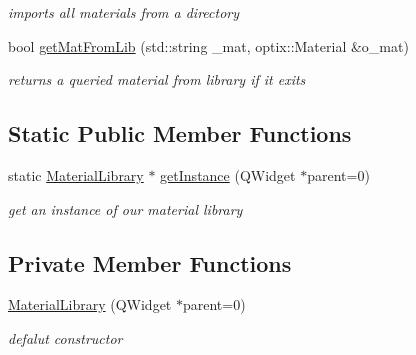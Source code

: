 \begin{DoxyCompactItemize}
\begin{DoxyCompactList}\small\item\em imports all materials from a directory \end{DoxyCompactList}\item 
bool \hyperlink{class_material_library_a0d8235104709564a600a6ece7ea048ae}{get\-Mat\-From\-Lib} (std\-::string \-\_\-mat, optix\-::\-Material \&o\-\_\-mat)
\begin{DoxyCompactList}\small\item\em returns a queried material from library if it exits \end{DoxyCompactList}\end{DoxyCompactItemize}
\subsection*{Static Public Member Functions}
\begin{DoxyCompactItemize}
\item 
\hypertarget{class_material_library_a9dddb26d8ba882414f96bf5e4e6c3cf6}{static \hyperlink{class_material_library}{Material\-Library} $\ast$ \hyperlink{class_material_library_a9dddb26d8ba882414f96bf5e4e6c3cf6}{get\-Instance} (Q\-Widget $\ast$parent=0)}\label{class_material_library_a9dddb26d8ba882414f96bf5e4e6c3cf6}

\begin{DoxyCompactList}\small\item\em get an instance of our material library \end{DoxyCompactList}\end{DoxyCompactItemize}
\subsection*{Private Member Functions}
\begin{DoxyCompactItemize}
\item 
\hypertarget{class_material_library_ac0fdd21aa44b30e4ef14f252f26c3f1e}{\hyperlink{class_material_library_ac0fdd21aa44b30e4ef14f252f26c3f1e}{Material\-Library} (Q\-Widget $\ast$parent=0)}\label{class_material_library_ac0fdd21aa44b30e4ef14f252f26c3f1e}

\begin{DoxyCompactList}\small\item\em defalut constructor \end{DoxyCompactList}\end{DoxyCompactItemize}
